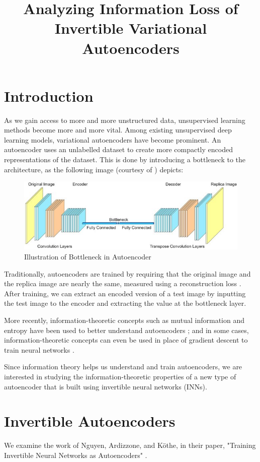\documentclass[11pt,letterpaper]{article}
\title{Analyzing Information Loss of Invertible Variational Autoencoders}
\author{\name}
\begin{document}
\maketitle

\section{Introduction}
As we gain access to more and more unstructured data, unsupervised learning methods become more and more vital.
Among existing unsupervised deep learning models, variational autoencoders have become prominent.
An autoencoder uses an unlabelled dataset to create more compactly encoded representations of the dataset.
This is done by introducing a bottleneck to the architecture, as the following image (courtesy of \cite{bottleneck_picture}) depicts:
\begin{figure}[!htb]
\begin{center}
   \includegraphics[width=0.65\linewidth]{./pics/bottleneck.jpg}
   \caption{Illustration of Bottleneck in Autoencoder}
\end{center}
\end{figure}

Traditionally, autoencoders are trained by requiring that the original image and the replica image are nearly the same, measured using a reconstruction loss \cite{VAEtutorial}.
After training, we can extract an encoded version of a test image by inputting the test image to the encoder and extracting the value at the bottleneck layer.

More recently, information-theoretic concepts such as mutual information and entropy have been used to better understand autoencoders \cite{infotheoretic_vaes}; and in some cases, information-theoretic concepts can even be used in place of gradient descent to train neural networks \cite{deep_infomax}.

Since information theory helps us understand and train autoencoders, we are interested in studying the information-theoretic properties of a new type of autoencoder that is built using invertible neural networks (INNs).

\section{Invertible Autoencoders}
We examine the work of Nguyen, Ardizzone, and K\"{o}the, in their paper, "Training Invertible Neural Networks as Autoencoders" \cite{Nguyen2019}.
\end{document}
